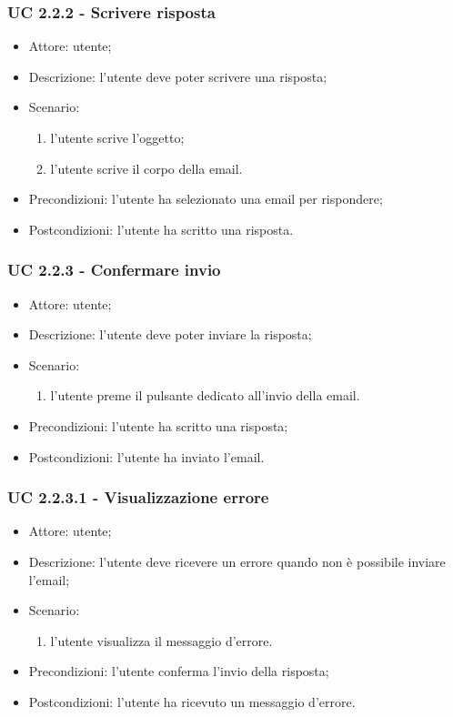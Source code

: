     \subsubsection{UC 2.2.2 - Scrivere risposta} \label{sec: UC 2.2.2}
    \begin{itemize}
        \item Attore: utente;
        \item Descrizione: l'utente deve poter scrivere una risposta;
        \item Scenario:
        \begin{enumerate}
        \item l'utente scrive l'oggetto;
        \item l'utente scrive il corpo della email.
        \end{enumerate}
        \item Precondizioni: l'utente ha selezionato una email per rispondere;
        \item Postcondizioni: l'utente ha scritto una risposta.
    \end{itemize}

    \subsubsection{UC 2.2.3 - Confermare invio} \label{sec: UC 2.2.3}
    \begin{itemize}
        \item Attore: utente;
        \item Descrizione: l'utente deve poter inviare la risposta;
        \item Scenario:
        \begin{enumerate}
        \item l'utente preme il pulsante dedicato all'invio della email.
        \end{enumerate}
        \item Precondizioni: l'utente ha scritto una risposta;
        \item Postcondizioni: l'utente ha inviato l'email.
    \end{itemize}

    \subsubsection{UC 2.2.3.1 - Visualizzazione errore} \label{sec: UC 2.2.3.1}
    \begin{itemize}
        \item Attore: utente;
        \item Descrizione: l'utente deve ricevere un errore quando non è possibile inviare l'email;
        \item Scenario:
        \begin{enumerate}
        \item l'utente visualizza il messaggio d'errore.
        \end{enumerate}  
        \item Precondizioni: l'utente conferma l'invio della risposta;
        \item Postcondizioni: l'utente ha ricevuto un messaggio d'errore.
    \end{itemize}

